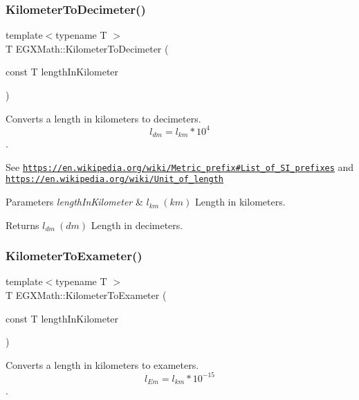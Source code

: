 \subsubsection{\texorpdfstring{Kilometer\+To\+Decimeter()}{KilometerToDecimeter()}}
{\footnotesize\ttfamily template$<$typename T $>$ \\
T E\+G\+X\+Math\+::\+Kilometer\+To\+Decimeter (\begin{DoxyParamCaption}\item[{const T}]{length\+In\+Kilometer }\end{DoxyParamCaption})}



Converts a length in kilometers to decimeters. \[ l_{dm}=l_{km} * 10^{4} \]. 

See \href{https://en.wikipedia.org/wiki/Metric_prefix#List_of_SI_prefixes}{\tt https\+://en.\+wikipedia.\+org/wiki/\+Metric\+\_\+prefix\#\+List\+\_\+of\+\_\+\+S\+I\+\_\+prefixes} and \href{https://en.wikipedia.org/wiki/Unit_of_length}{\tt https\+://en.\+wikipedia.\+org/wiki/\+Unit\+\_\+of\+\_\+length} 
\begin{DoxyParams}{Parameters}
{\em length\+In\+Kilometer} & $ l_{km}\ (km)$ Length in kilometers. \\
\hline
\end{DoxyParams}
\begin{DoxyReturn}{Returns}
$ l_{dm}\ (dm)$ Length in decimeters. 
\end{DoxyReturn}
\mbox{\label{group___e_g_x_math-_conversions-_length_conversions-_kilometer-_s_i_gae947c63c1b914d80d7ed3b35df15d02a}} 
\subsubsection{\texorpdfstring{Kilometer\+To\+Exameter()}{KilometerToExameter()}}
{\footnotesize\ttfamily template$<$typename T $>$ \\
T E\+G\+X\+Math\+::\+Kilometer\+To\+Exameter (\begin{DoxyParamCaption}\item[{const T}]{length\+In\+Kilometer }\end{DoxyParamCaption})}



Converts a length in kilometers to exameters. \[ l_{Em}=l_{km} * 10^{-15} \]. 


